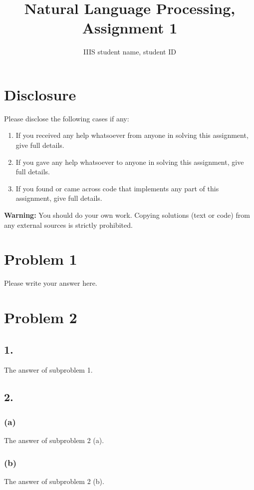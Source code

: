 \documentclass{article}
\title{\textmd{\bf Natural Language Processing, Assignment 1}}
\author{IIIS student name, student ID}
\begin{document}
\maketitle\thispagestyle{empty}

\section*{Disclosure}

Please disclose the following cases if any:
\begin{enumerate}
    \item If you received any help whatsoever from anyone in solving this assignment, give full details.
    \item If you gave any help whatsoever to anyone in solving this assignment, give full details.
    \item If you found or came across code that implements any part of this assignment, give full details.
\end{enumerate}
\textbf{Warning:} You should do your own work. Copying solutions (text or code) from any external sources is strictly prohibited.


\section*{Problem 1}
Please write your answer here.

\section*{Problem 2}

\subsection*{1.}
The answer of subproblem 1.

\subsection*{2.}

\subsubsection*{(a)}
The answer of subproblem 2 (a).

\subsubsection*{(b)}
The answer of subproblem 2 (b).
\end{document}
